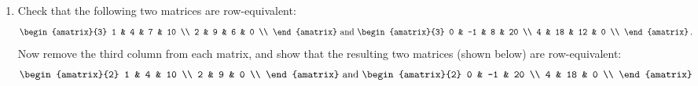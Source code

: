 \begin{enumerate}
%
%
\item %
Check that the following two matrices are row-equivalent:
\[
\begin{amatrix}{3}
1 & 4 & 7 & 10 \\
2 & 9 & 6 & 0 \\
\end{amatrix}
\mbox{ and }
\begin{amatrix}{3}
0 & -1 & 8 & 20 \\
4 & 18 & 12 & 0 \\
\end{amatrix}\, .
\]
Now remove the third column from each matrix, and show that the resulting two matrices (shown below) are row-equivalent:
\[
\begin{amatrix}{2}
1 & 4 & 10 \\
2 & 9 & 0 \\
\end{amatrix}
\mbox{ and }
\begin{amatrix}{2}
0 & -1 & 20 \\
4 & 18 & 0 \\

\end{amatrix}\]
\end{enumerate}
